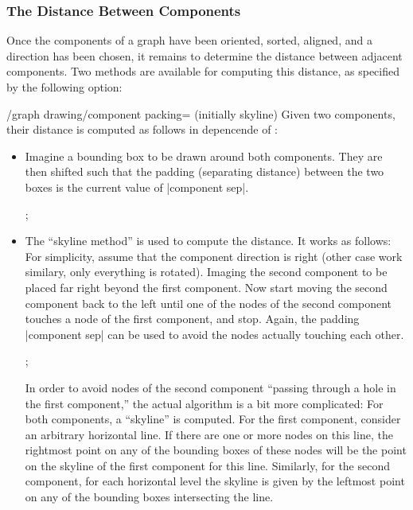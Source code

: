 \subsubsection{The Distance Between Components}

Once the components of a graph have been oriented, sorted, aligned,
and a direction has been chosen, it remains to determine the distance
between adjacent components. Two methods are available for computing
this distance, as specified by the following option:

\begin{key}{/graph drawing/component packing= (initially
    skyline)}
  Given two components, their distance is computed as follows in
  depencende of :
  \begin{itemize}
  \item {}

    Imagine a bounding box to be drawn around both components. They
    are then shifted such that the padding (separating distance)
    between the two boxes is the current value of |component sep|.
\begin{codeexample}[]
\tikz {};
\end{codeexample}
  \item {}

    The ``skyline method'' is used to compute the distance. It works
    as follows: For simplicity, assume that the component direction is
    right (other case work similary, only everything is
    rotated). Imaging the second  component to be placed far right
    beyond the first component. Now start moving the second component
    back to the left until one of the nodes of the second component
    touches a node of the first component, and stop. Again, the
    padding |component sep| can be used to avoid the nodes actually
    touching each other. 
    
\begin{codeexample}[]
\tikz {};
\end{codeexample}

    In order to avoid nodes of the second component ``passing through
    a hole in the first component,'' the actual algorithm is a bit
    more complicated: For both components, a ``skyline'' is
    computed. For the first component, consider an arbitrary
    horizontal line. If there are one or more nodes on this line, the
    rightmost point on any of the bounding boxes of these nodes will
    be the point on the skyline of the first component for this
    line. Similarly, for the second component, for each horizontal
    level the skyline is given by the leftmost point on any of the
    bounding boxes intersecting the line.


\end{itemize}
\end{key}
